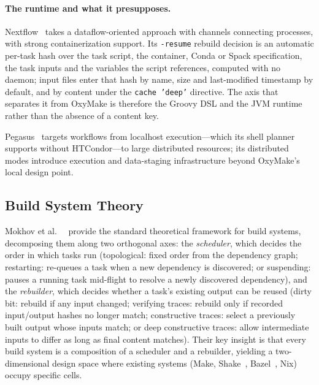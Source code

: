 \documentclass[12pt,a4paper]{article}
\newcommand{\code}[1]{{\texttt{\small\color{inlinecode}#1}}}
\begin{document}
\paragraph{The runtime and what it presupposes.}
Nextflow~\cite{diTommasoNextflowEnablesReproducible2017} takes a
dataflow-oriented approach with channels connecting processes, with
strong containerization support. Its \code{-resume} rebuild decision is
an automatic per-task hash over the task script, the container, Conda or
Spack specification, the task inputs and the variables the script
references, computed with no daemon; input files enter that hash by
name, size and last-modified timestamp by default, and by content under
the \code{cache 'deep'} directive. The axis that separates it from
OxyMake is therefore the Groovy DSL and the JVM runtime rather than the
absence of a content key.

Pegasus~\cite{deelmanPegasusWorkflowManagement2015} targets workflows
from localhost execution---which its shell planner supports without
HTCondor---to large distributed resources; its distributed modes
introduce execution and data-staging infrastructure beyond OxyMake's
local design point.

\subsection{Build System Theory}
\label{sec:build-theory}

Mokhov et al.~\cite[\S3--4]{mokhovBuildSystemsCarte2018}~\cite[\S4--5]{mokhovBuildSystemsCarte2020}
provide the standard theoretical framework for build systems, decomposing
them along two orthogonal axes: the \emph{scheduler}, which decides the
order in which tasks run (topological: fixed order from the dependency graph;
restarting: re-queues a task when a new dependency is discovered; or
suspending: pauses a running task mid-flight to resolve a newly discovered
dependency), and the \emph{rebuilder}, which decides whether a task's
existing output can be reused (dirty bit: rebuild if any input changed;
verifying traces: rebuild only if recorded input/output hashes no longer
match; constructive traces: select a previously built output whose
inputs match; or deep constructive traces: allow intermediate inputs to
differ as long as final content matches). Their key insight
is that every build system is a composition of a scheduler and a rebuilder,
yielding a two-dimensional design space where existing systems (Make,
Shake~\cite{mitchellShakeBuildSystem2012},
Bazel~\cite{bazel}, Nix) occupy specific cells.
\end{document}
